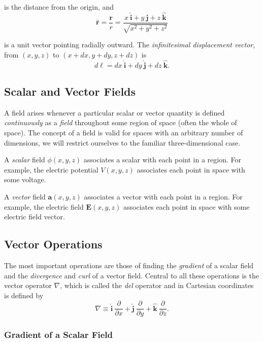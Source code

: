 \documentclass{article}
\newcommand{\ihat}{\mathbf{\hat{i}}}
\newcommand{\jhat}{\mathbf{\hat{j}}}
\newcommand{\khat}{\mathbf{\hat{k}}}
\newcommand{\rhat}{\mathbf{\hat{r}}}
\begin{document}
is the distance from the origin, and
\begin{equation*}
    \rhat = \frac{\bm{r}}{r} = \frac{x\ \ihat + y\ \jhat + z\ \khat}{\sqrt{x^2 + y^2 + z^2}}
\end{equation*}

is a unit vector pointing radially outward. The \emph{infinitesimal displacement vector}, from $(x, y, z)$ to $(x + dx, y + dy, z + dz)$ is
\begin{equation*}
    d\bm{\ell} = dx\ \ihat + dy\ \jhat + dz\ \khat.
\end{equation*}

\subsection{Scalar and Vector Fields}

A field arises whenever a particular scalar or vector quantity is defined \emph{continuously} as a \emph{field} throughout some region of space (often the whole of space). The concept of a field is valid for spaces with an arbitrary number of dimensions, we will restrict ourselves to the familiar three-dimensional case.

A \emph{scalar} field $\phi(x,y,z)$ associates a scalar with each point in a region. For example, the electric potential $V(x,y,z)$ associates each point in space with some voltage.

A \emph{vector} field $\bm{a}(x,y,z)$ associates a vector with each point in a region. For example, the electric field $\bm{E}(x,y,z)$ associates each point in space with some electric field vector.

\subsection{Vector Operations}

The most important operations are those of finding the \emph{gradient} of a scalar field and the \emph{divergence} and \emph{curl} of a vector field. Central to all these operations is the vector operator $\nabla$, which is called the \emph{del} operator and in Cartesian coordinates is defined by
\begin{equation*}
    \nabla \equiv \ihat\ \frac{\partial}{\partial x} + \jhat\ \frac{\partial}{\partial y} + \khat\ \frac{\partial}{\partial z}.
\end{equation*}

\subsubsection{Gradient of a Scalar Field}
\end{document}
